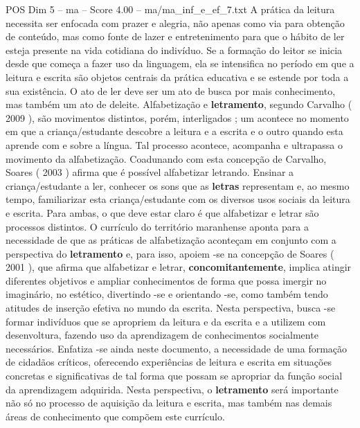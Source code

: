 \begin{textsample}{POS Dim 5 – ma – Score 4.00 – ma/ma\_inf\_e\_ef\_7.txt}
A prática da leitura necessita ser enfocada com prazer e alegria, não apenas como via para obtenção de conteúdo, mas como fonte de lazer e entretenimento para que o hábito de ler esteja presente na vida cotidiana do indivíduo.
Se a formação do leitor se inicia desde que começa a fazer uso da linguagem, ela se intensifica no período em que a leitura e escrita são objetos centrais da prática educativa e se estende por toda a sua existência.
O ato de ler deve ser um ato de busca por mais conhecimento, mas também um ato de deleite.
Alfabetização e \textbf{letramento}, segundo Carvalho ( 2009 ), são movimentos distintos, porém, interligados ; um acontece no momento em que a criança/estudante descobre a leitura e a escrita e o outro quando esta aprende com e sobre a língua.
Tal processo acontece, acompanha e ultrapassa o movimento da alfabetização.
Coadunando com esta concepção de Carvalho, Soares ( 2003 ) afirma que é possível alfabetizar letrando.
Ensinar a criança/estudante a ler, conhecer os sons que as \textbf{letras} representam e, ao mesmo tempo, familiarizar esta criança/estudante com os diversos usos sociais da leitura e escrita.
Para ambas, o que deve estar claro é que alfabetizar e letrar são processos distintos.
O currículo do território maranhense aponta para a necessidade de que as práticas de alfabetização aconteçam em conjunto com a perspectiva do \textbf{letramento} e, para isso, apoiem -se na concepção de Soares ( 2001 ), que afirma que alfabetizar e letrar, \textbf{concomitantemente}, implica atingir diferentes objetivos e ampliar conhecimentos de forma que possa imergir no imaginário, no estético, divertindo -se e orientando -se, como também tendo atitudes de inserção efetiva no mundo da escrita.
Nesta perspectiva, busca -se formar indivíduos que se apropriem da leitura e da escrita e a utilizem com desenvoltura, fazendo uso da aprendizagem de conhecimentos socialmente necessários.
Enfatiza -se ainda neste documento, a necessidade de uma formação de cidadãos críticos, oferecendo experiências de leitura e escrita em situações concretas e significativas de tal forma que possam se apropriar da função social da aprendizagem adquirida.
Nesta perspectiva, o \textbf{letramento} será importante não só no processo de aquisição da leitura e escrita, mas também nas demais áreas de conhecimento que compõem este currículo.

\end{textsample}
